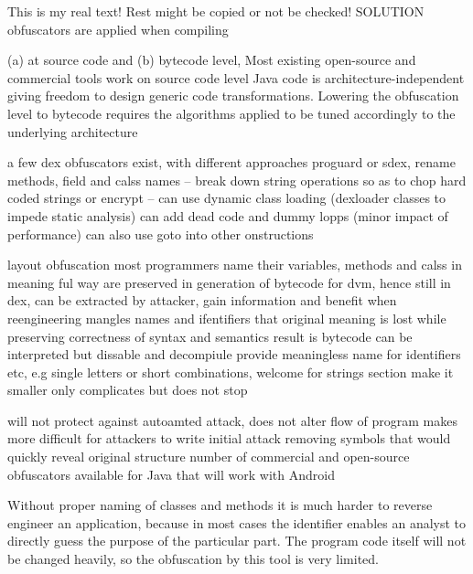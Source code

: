This is my real text! Rest might be copied or not be checked!
SOLUTION
obfuscators are applied when compiling

%
(a) at source code and (b) bytecode level, Most existing open-source and commercial tools work on source code level\newline
Java code is architecture-independent giving freedom to design generic code transformations. Lowering the obfuscation level to bytecode requires the algorithms applied to be tuned accordingly to the underlying architecture\newline
\cite{kovachevaMaster}
%

%
a few dex obfuscators exist, with different approaches
proguard or sdex, rename methods, field and calss names -- break down string operations so as to chop hard coded strings or encrypt -- can use dynamic class loading (dexloader classes to impede static analysis)
can add dead code and dummy lopps (minor impact of performance)
can also use goto into other onstructions

\cite{andevconDalvikART}
%


%

layout obfuscation
most programmers name their variables, methods and calss in meaning ful way
are preserved in generation of bytecode for dvm, hence still in dex, can be extracted by attacker, gain information and benefit when reengineering
mangles names and ifentifiers that original meaning is lost while preserving correctness of syntax and semantics
result is bytecode can be interpreted but dissable and decompiule provide meaningless name for identifiers etc, e.g single letters or short combinations, welcome for strings section make it smaller
only complicates but does not stop


\cite{munteanLicense}
%

%
will not protect against autoamted attack, does not alter flow of program
makes more difficult for attackers to write initial attack
removing symbols that would quickly reveal original structure
number of commercial and open-source obfuscators available for Java that will work with Android
\cite{developersSecuring}
%


Without proper naming of classes and methods it is much harder to reverse engineer an application, because in most cases the identifier enables an analyst to directly guess the purpose of the particular part. The program code itself will not be changed heavily, so the obfuscation by this tool is very limited.


